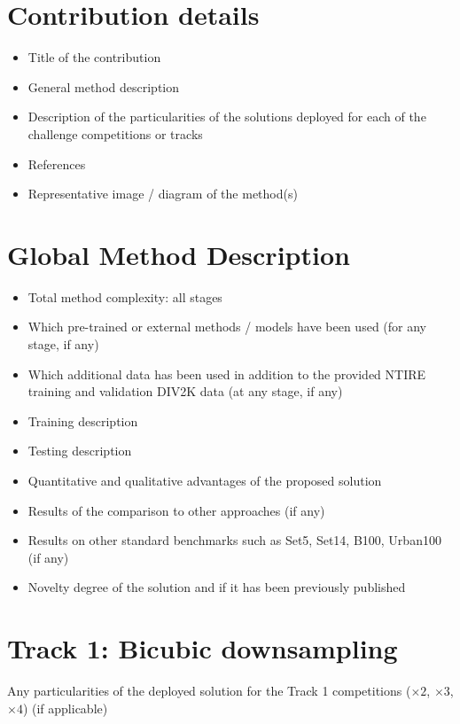 \documentclass{article}
\begin{document}
\section{Contribution details}

\begin{itemize}
\item Title of the contribution                                  
\item General method description                                
\item Description of the particularities of the solutions deployed for each of the challenge competitions or tracks
\item References                                               
\item Representative image / diagram of the method(s)             
\end{itemize}

\section{Global Method Description}

\begin{itemize}
\item Total method complexity: all stages
\item Which pre-trained or external methods / models have been used (for any stage, if any) 
\item Which additional data has been used in addition to the provided NTIRE training and validation DIV2K data (at any stage, if any) 
\item Training description
\item Testing description
\item Quantitative and qualitative advantages of the proposed solution
\item Results of the comparison to other approaches (if any)
\item Results on other standard benchmarks such as Set5, Set14, B100, Urban100 (if any)
\item Novelty degree of the solution and if it has been previously published
\end{itemize}

\section{Track 1: Bicubic downsampling}
Any particularities of the deployed solution for the Track 1 competitions ($\times2$, $\times3$, $\times 4$) (if applicable)
\end{document}
